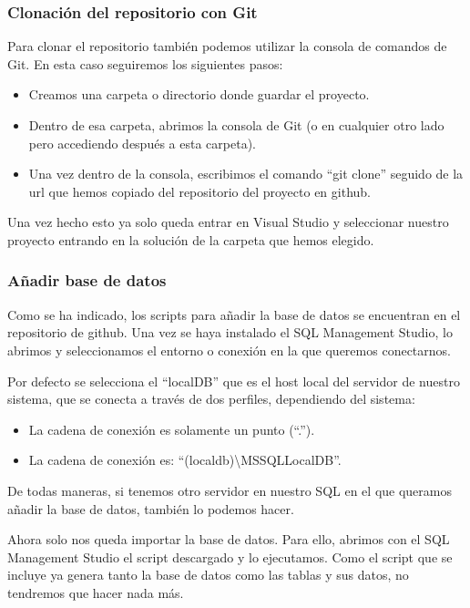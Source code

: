 \subsubsection{Clonación del repositorio con Git}
Para clonar el repositorio también podemos utilizar la consola de comandos de Git. En esta caso seguiremos los siguientes pasos:
\begin{itemize}
    \item Creamos una carpeta o directorio donde guardar el proyecto.
    \item Dentro de esa carpeta, abrimos la consola de Git (o en cualquier otro lado pero accediendo después a esta carpeta).
    \item Una vez dentro de la consola, escribimos el comando ``git clone'' seguido de la url que hemos copiado del repositorio del proyecto en github.
\end{itemize}

Una vez hecho esto ya solo queda entrar en Visual Studio y seleccionar nuestro proyecto entrando en la solución de la carpeta que hemos elegido.

\subsubsection{Añadir base de datos}
Como se ha indicado, los scripts para añadir la base de datos se encuentran en el repositorio de github. Una vez se haya instalado el SQL Management Studio, lo abrimos y seleccionamos el entorno o conexión en la que queremos conectarnos.

Por defecto se selecciona el ``localDB'' que es el host local del servidor de nuestro sistema, que se conecta a través de dos perfiles, dependiendo del sistema:
\begin{itemize}
\tightlist
    \item La cadena de conexión es solamente un punto (``.'').
    \item La cadena de conexión es: ``(localdb)\textbackslash MSSQLLocalDB''.
\end{itemize}

De todas maneras, si tenemos otro servidor en nuestro SQL en el que queramos añadir la base de datos, también lo podemos hacer.

Ahora solo nos queda importar la base de datos. Para ello, abrimos con el SQL Management Studio el script descargado y lo ejecutamos. Como el script que se incluye ya genera tanto la base de datos como las tablas y sus datos, no tendremos que hacer nada más.

